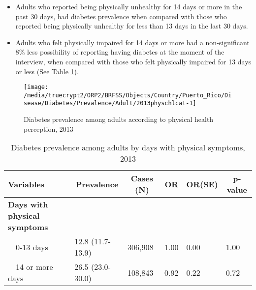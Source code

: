  
\newpage

 \newpage
\begin{itemize}

\item Adults who reported being physically unhealthy for 14 days or more in the past 30 days, had 
 diabetes prevalence when compared with 
those who reported being physically unhealthy for less than 13 days in the last 30 days.


\item Adults who felt physically impaired for 14 days or more had a non-significant 8\% less possibility of reporting having diabetes at the moment of the interview, when compared with those who felt physically impaired for 13 days or less (See Table \ref{tab:phys.Diabetes.2013}).

\end{itemize}

\begin{figure}[H]
\caption{Diabetes prevalence among adults according to physical health perception, 2013}
\label{fig:phys.Diabetes.2013}
\begin{knitrout}
\color{fgcolor}

{\centering \texttt{[image: /media/truecrypt2/ORP2/BRFSS/Objects/Country/Puerto\_Rico/Disease/Diabetes/Prevalence/Adult/2013physchlcat-1]} 

}



\end{knitrout}
 \end{figure}

\begin{table}[H]
\caption{Diabetes prevalence among adults by days with physical symptoms, 2013\label{tab:phys.Diabetes.2013}} 
\begin{center}
\begin{tabular}{llllll}
\hline\hline
\multicolumn{1}{l}{Variables}&\multicolumn{1}{c}{Prevalence}&\multicolumn{1}{c}{Cases (N)}&\multicolumn{1}{c}{OR}&\multicolumn{1}{c}{OR(SE)}&\multicolumn{1}{c}{p-value}\tabularnewline
\hline
{\bfseries Days with physical symptoms}&&&&&\tabularnewline
~~0-13 days&12.8 (11.7-13.9)&306,908&1.00&0.00&1.00\tabularnewline
~~14 or more days&26.5 (23.0-30.0)&108,843&0.92&0.22&0.72\tabularnewline
\hline
\end{tabular}\end{center}

\end{table}


